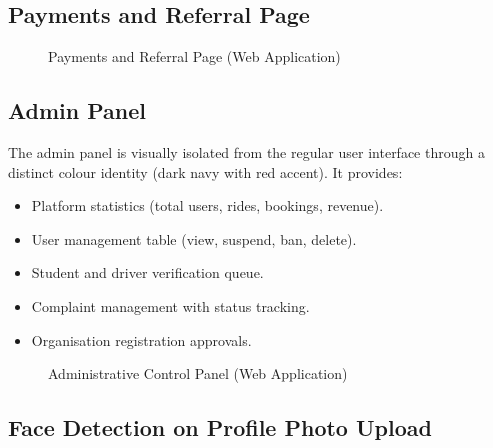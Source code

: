\documentclass[12pt,a4paper,openright]{report}
\begin{document}
\subsection{Payments and Referral Page}

\begin{figure}[H]
\centering
{}
\caption{Payments and Referral Page (Web Application)}
\label{fig:web-payments}
\end{figure}

\subsection{Admin Panel}

The admin panel is visually isolated from the regular user interface through a distinct colour identity (dark navy with red accent). It provides:
\begin{itemize}[noitemsep]
    \item Platform statistics (total users, rides, bookings, revenue).
    \item User management table (view, suspend, ban, delete).
    \item Student and driver verification queue.
    \item Complaint management with status tracking.
    \item Organisation registration approvals.
\end{itemize}

\begin{figure}[H]
\centering
{}
\caption{Administrative Control Panel (Web Application)}
\label{fig:web-admin}
\end{figure}

\subsection{Face Detection on Profile Photo Upload}
\end{document}

